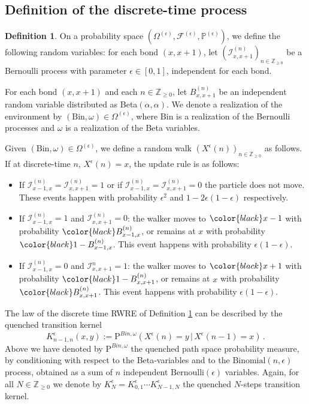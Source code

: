 \documentclass[a4paper,11pt,oneside,reqno]{amsart}
\theoremstyle{definition}
\newtheorem{definition}[theorem]{Definition}
\renewcommand{\geq}{\geqslant}
\numberwithin{equation}{section}
\begin{document}
\subsection{Definition of the discrete-time process}
\begin{definition} \label{definition-RWREdiscrete}
	On a probability space $(\Omega^{(\epsilon)}, \mathcal{F}^{(\epsilon)}, \mathbb{P}^{(\epsilon)})$, we define the following random variables: for each bond $(x,x+1)$, let  $\left(\mathcal{I}_{x,x+1}^{(n)}\right)_{n\in \mathbb{Z}_{\geq 0}}$ be a Bernoulli process with parameter $\epsilon\in [0,1]$,  independent for each bond. 
	
	
	For each bond $(x,x+1)$ and each $n\in \mathbb{Z}_{\geq 0}$,  let  $B_{x,x+1}^{(n)}$ be an independent random variable distributed as  Beta$(\alpha,\alpha)$. 
	We denote a realization of the  environment by $(\text{Bin}, \omega)\in \Omega^{(\epsilon)}$, where  $\text{Bin}$ is a realization of the Bernoulli processes and $\omega$ is a realization of the Beta variables.
	
	
	Given $(\text{Bin}, \omega)\in \Omega^{(\epsilon)}$, we define a random walk $(X^{\epsilon}(n))_{n\in\mathbb{Z}_{\geq 0}}$ as follows. If at discrete-time $n$, $X^{\epsilon}(n)=x$,  the update rule is as follows:
	\begin{itemize}[leftmargin=12pt]
		\item If $\mathcal{I}^{(n)}_{x-1,x} = \mathcal{I}^{(n)}_{x,x+1} = 1$ or if $\mathcal{I}^{(n)}_{x-1,x} = \mathcal{I}^{(n)}_{x,x+1} = 0$ the particle does not move. These events happen with probability $\epsilon^{2}$ and $1-2\epsilon(1-\epsilon)$ respectively. 
		\item If $\mathcal{I}^{(n)}_{x-1,x} = 1$ and $\mathcal{I}^{(n)}_{x,x+1} = 0$: the walker moves to ${\color{black}x-1}$ with probability ${\color{black} B^{(n)}_{x-1,x}}$, or remains at $x$ with probability ${\color{black}1-B^{(n)}_{x-1,x}}$. This event happens with probability $\epsilon(1-\epsilon)$. 
		\item If $\mathcal{I}^{(n)}_{x-1,x} = 0$ and $\mathcal{I}^{n}_{x,x+1} = 1$: the walker moves to ${\color{black}x+1}$ with probability ${\color{black}1-B^{(n)}_{x,x+1}}$, or remains at  $x$ with probability ${\color{black}B^{(n)}_{x,x+1}}$. This event happens with probability $\epsilon(1-\epsilon)$.
	\end{itemize}
\end{definition}



The law of the discrete time RWRE of Definition \ref{definition-RWREdiscrete} can be described by the quenched transition kernel 
\begin{equation*}
	K_{n-1,n}^{\epsilon}(x,y):=\mathrm{P}^{Bin,\omega}(X^{\epsilon}(n)=y\,|\, X^{\epsilon}(n-1)=x)\,. 
\end{equation*}
Above we have denoted by $\mathrm{P}^{Bin,\omega}$ the quenched path space probability measure, by conditioning with respect to the Beta-variables and to the $\text{Binomial}(n,\epsilon)$ process, obtained as a sum of $n$ independent $\text{Bernoulli}(\epsilon)$ variables. Again, for all $N\in\mathbb{Z}_{\geq 0}$ we denote by  $K_{N}^{\epsilon}=K_{0,1}^{\epsilon}\cdots K_{N-1,N}^{\epsilon}$ the quenched $N$-steps transition kernel. 
\end{document}
